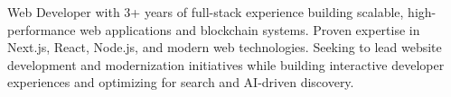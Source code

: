 \documentclass[letter,10pt]{article}
\begin{document}
Web Developer with 3+ years of full-stack experience building scalable, high-performance web applications and blockchain systems. Proven expertise in Next.js, React, Node.js, and modern web technologies. Seeking to lead website development and modernization initiatives while building interactive developer experiences and optimizing for search and AI-driven discovery.
\end{document}
